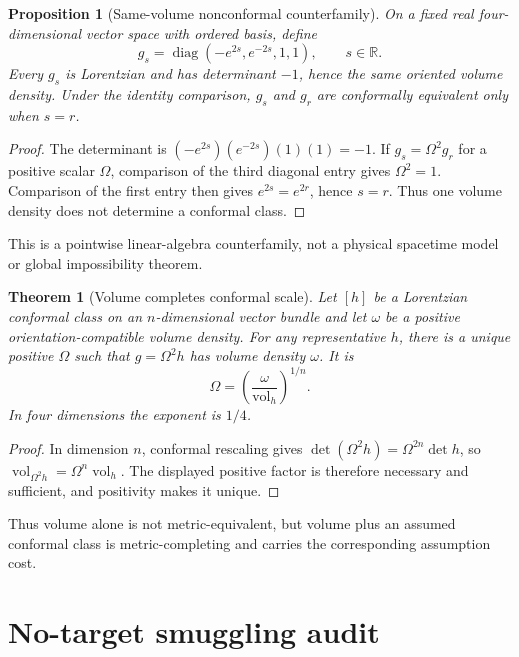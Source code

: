 \documentclass[11pt]{article}
\newtheorem{theorem}{Theorem}
\newtheorem{proposition}{Proposition}
\begin{document}
\begin{proposition}[Same-volume nonconformal counterfamily]
On a fixed real four-dimensional vector space with ordered basis, define
\[
 g_s=\operatorname{diag}(-e^{2s},e^{-2s},1,1),\qquad s\in\mathbb R.
\]
Every \(g_s\) is Lorentzian and has determinant \(-1\), hence the same
oriented volume density. Under the identity comparison,
\(g_s\) and \(g_r\) are conformally equivalent only when \(s=r\).
\end{proposition}

\begin{proof}
The determinant is
\((-e^{2s})(e^{-2s})(1)(1)=-1\). If
\(g_s=\Omega^2g_r\) for a positive scalar \(\Omega\), comparison of the
third diagonal entry gives \(\Omega^2=1\). Comparison of the first entry then
gives \(e^{2s}=e^{2r}\), hence \(s=r\). Thus one volume density does not
determine a conformal class.
\end{proof}

This is a pointwise linear-algebra counterfamily, not a physical spacetime
model or global impossibility theorem.

\begin{theorem}[Volume completes conformal scale]
Let \([h]\) be a Lorentzian conformal class on an \(n\)-dimensional vector
bundle and let \(\omega\) be a positive orientation-compatible volume density.
For any representative \(h\), there is a unique positive \(\Omega\) such that
\(g=\Omega^2h\) has volume density \(\omega\). It is
\[
  \Omega=\left(\frac{\omega}{\operatorname{vol}_h}\right)^{1/n}.
\]
In four dimensions the exponent is \(1/4\).
\end{theorem}

\begin{proof}
In dimension \(n\), conformal rescaling gives
\(\det(\Omega^2h)=\Omega^{2n}\det h\), so
\(\operatorname{vol}_{\Omega^2h}=\Omega^n\operatorname{vol}_h\).
The displayed positive factor is therefore necessary and sufficient, and
positivity makes it unique.
\end{proof}

Thus volume alone is not metric-equivalent, but volume plus an assumed
conformal class is metric-completing and carries the corresponding assumption
cost.

\section{No-target smuggling audit}
\end{document}
